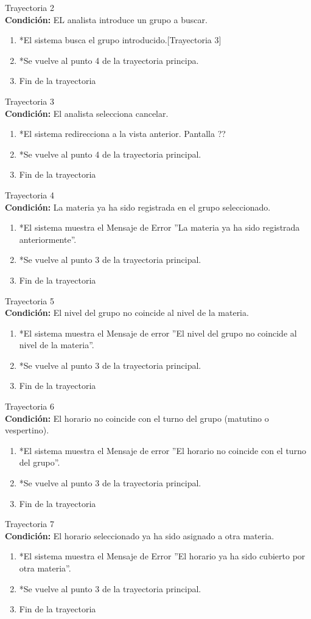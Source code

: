 		\large{Trayectoria 2}\\
		\textbf{Condición:} EL analista introduce un grupo a buscar.
		\begin{enumerate}
			\item *El sistema busca el grupo introducido.[Trayectoria 3]
			\item *Se vuelve al punto 4 de la trayectoria principa.
			\item Fin de la trayectoria
		\end{enumerate}
		\large{Trayectoria 3}\\
		\textbf{Condición:} El analista selecciona cancelar.
		\begin{enumerate}
			\item *El sistema redirecciona a la vista anterior. Pantalla ??
			\item *Se vuelve al punto 4 de la trayectoria principal.
			\item Fin de la trayectoria
		\end{enumerate}
		\large{Trayectoria 4}\\
		\textbf{Condición:} La materia ya ha sido registrada en el grupo seleccionado.
		\begin{enumerate}
			\item *El sistema muestra el Mensaje de Error ''La materia ya ha sido registrada anteriormente''.
			\item *Se vuelve al punto 3 de la trayectoria principal.
			\item Fin de la trayectoria
		\end{enumerate}
		\large{Trayectoria 5}\\
		\textbf{Condición:} El nivel del grupo no coincide al nivel de la materia.
		\begin{enumerate}
			\item *El sistema muestra el Mensaje de error ''El nivel del grupo no coincide al nivel de la materia''.
			\item *Se vuelve al punto 3 de la trayectoria principal.
			\item Fin de la trayectoria
		\end{enumerate}
		\large{Trayectoria 6}\\
		\textbf{Condición:} El horario no coincide con el turno del grupo (matutino o vespertino).
		\begin{enumerate}
			\item *El sistema muestra el 	Mensaje de error ''El horario no coincide con el turno del grupo''.
			\item *Se vuelve al punto 3 de la trayectoria principal.
			\item Fin de la trayectoria
		\end{enumerate}
		\large{Trayectoria 7}\\
		\textbf{Condición:} El horario seleccionado ya ha sido asignado a otra materia.
		\begin{enumerate}
			\item *El sistema muestra el Mensaje de Error ''El horario ya ha sido cubierto por otra materia''.
			\item *Se vuelve al punto 3 de la trayectoria principal.
			\item Fin de la trayectoria
		\end{enumerate}